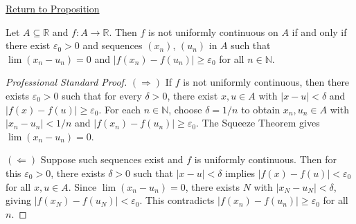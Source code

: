 \newpage
{}
\label{prf:non-uniform-continuity-criteria}

\begin{remark*}[Return]
\hyperref[prop:non-uniform-continuity-criteria]{Return to Proposition}
\end{remark*}

\begin{theorem*}
Let $A \subseteq \mathbb{R}$ and $f : A \to \mathbb{R}$. Then $f$ is not uniformly continuous on $A$ if and only if there exist $\varepsilon_0 > 0$ and sequences $(x_n)$, $(u_n)$ in $A$ such that $\lim(x_n - u_n) = 0$ and $|f(x_n) - f(u_n)| \geq \varepsilon_0$ for all $n \in \mathbb{N}$.
\end{theorem*}

\begin{proof}[Professional Standard Proof]
\LRAProofBodyStart
$(\Rightarrow)$ If $f$ is not uniformly continuous, then there exists $\varepsilon_0 > 0$ such that for every $\delta > 0$, there exist $x, u \in A$ with $|x - u| < \delta$ and $|f(x) - f(u)| \geq \varepsilon_0$. For each $n \in \mathbb{N}$, choose $\delta = 1/n$ to obtain $x_n, u_n \in A$ with $|x_n - u_n| < 1/n$ and $|f(x_n) - f(u_n)| \geq \varepsilon_0$. The Squeeze Theorem gives $\lim(x_n - u_n) = 0$.

$(\Leftarrow)$ Suppose such sequences exist and $f$ is uniformly continuous. Then for this $\varepsilon_0 > 0$, there exists $\delta > 0$ such that $|x - u| < \delta$ implies $|f(x) - f(u)| < \varepsilon_0$ for all $x, u \in A$. Since $\lim(x_n - u_n) = 0$, there exists $N$ with $|x_N - u_N| < \delta$, giving $|f(x_N) - f(u_N)| < \varepsilon_0$. This contradicts $|f(x_n) - f(u_n)| \geq \varepsilon_0$ for all $n$.
\end{proof}

